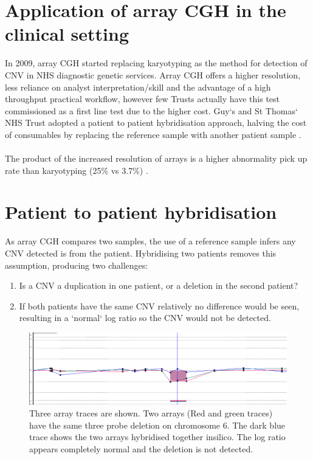 \section{Application of array CGH in the clinical setting}
In 2009, array CGH started replacing karyotyping as the method for detection of CNV in NHS diagnostic genetic services. Array CGH offers a higher resolution, less reliance on analyst interpretation/skill and the advantage of a high throughput practical workflow, however few Trusts actually have this test commissioned as a first line test due to the higher cost. Guy`s and St Thomas` NHS Trust adopted a patient to patient hybridisation approach, halving the cost of consumables by replacing the reference sample with another patient sample \cite{ahn2010}.

\paragraph*{}
The product of the increased resolution of arrays is a higher abnormality pick up rate than karyotyping (25\% vs 3.7\%) \cite{ahn2013,jordan_microarrays_2012}. 

\section{Patient to patient hybridisation}
As array CGH compares two samples, the use of a reference sample infers any CNV detected is from the patient. Hybridising two patients removes this assumption, producing two challenges:
\begin{enumerate}
\item Is a CNV a duplication in one patient, or a deletion in the second patient?
\item If both patients have the same CNV relatively no difference would be seen, resulting in a `normal` log ratio so the CNV would not be detected.
\end{enumerate}
\begin{figure}
\centering
\includegraphics[width=\linewidth]{./Figures/SharedImbalance.jpg}
\caption[A trace showing how a shared imbalance would not be detected]{Three array traces are shown. Two arrays (Red and green traces) have the same three probe deletion on chromosome 6. The dark blue trace shows the two arrays hybridised together insilico. The log ratio appears completely normal and the deletion is not detected.}
\label{fig:SharedImbalance}
\end{figure}

